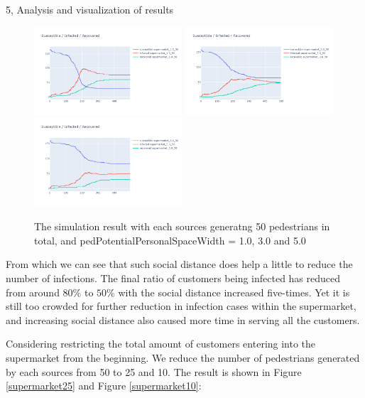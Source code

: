 \documentclass[10pt,a4paper]{article}
\begin{document}
\begin{task}{5, Analysis and visualization of results}
\begin{figure}[H]
    \includegraphics[width=5.5cm]{images/supermarket_1.0_50.png}
    \includegraphics[width=5.5cm]{images/supermarket_3.0_50.png}
    \includegraphics[width=5.5cm]{images/supermarket_5.0_50.png}
    \centering
    \caption{The simulation result with each sources generatng 50 pedestrians in total, and pedPotentialPersonalSpaceWidth = 1.0, 3.0 and 5.0}
    \label{supermarket50}
\end{figure}

From which we can see that such social distance does help a little to reduce the number of infections. The final ratio of customers being infected has reduced from around $80\%$ to $50\%$ with the social distance increased five-times. Yet it is still too crowded for further reduction in infection cases within the supermarket, and increasing social distance also caused more time in serving all the customers.

Considering restricting the total amount of customers entering into the supermarket from the beginning. We reduce the number of pedestrians generated by each sources from 50 to 25 and 10. The result is shown in Figure \ref{supermarket25} and Figure \ref{supermarket10}:


\end{task}
\end{document}

